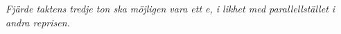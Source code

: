 \textit{Fjärde taktens tredje ton ska möjligen vara ett e, i likhet med parallellstället i andra reprisen.}